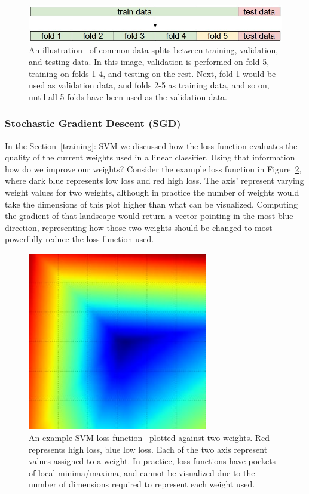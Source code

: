 \begin{figure}[ht!]
	\centering	\includegraphics[width=1\textwidth,keepaspectratio]{figs/crossval.jpeg}
    \caption{An illustration~\cite{cs231} of common data splits between training, validation, and testing data. In this image, validation is performed on fold 5, training on folds 1-4, and testing on the rest. Next, fold 1 would be used as validation data, and folds 2-5 as training data, and so on, until all 5 folds have been used as the validation data.}
\label{fig:crossval}      
\end{figure}

\subsubsection{Stochastic Gradient Descent (SGD)}
In the Section~\ref{training}: SVM we discussed how the loss function evaluates the quality of the current weights used in a linear classifier. Using that information how do we improve our weights? Consider the example loss function in Figure~\ref{fig:svmlossgrad}, where dark blue represents low loss and red high loss. The axis' represent varying weight values for two weights, although in practice the number of weights would take the dimensions of this plot higher than what can be visualized. Computing the gradient of that landscape would return a vector pointing in the most blue direction, representing how those two weights should be changed to most powerfully reduce the loss function used.

\begin{figure}[ht!]
	\centering \includegraphics[width=0.7\textwidth,keepaspectratio]{figs/svm_one.jpg}
    \caption{An example SVM loss function~\cite{cs231} plotted against two weights. Red represents high loss, blue low loss. Each of the two axis represent values assigned to a weight. In practice, loss functions have pockets of local minima/maxima, and cannot be visualized due to the number of dimensions required to represent each weight used.}
\label{fig:svmlossgrad}      
\end{figure}

